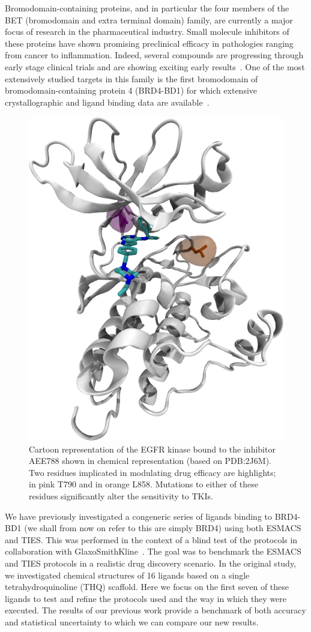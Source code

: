 \documentclass[conference]{IEEEtran}
\begin{document}
Bromodomain-containing proteins, and in particular the four members of the BET
(bromodomain and extra terminal domain) family, are currently a major focus of
research in the pharmaceutical industry. Small molecule inhibitors of these
proteins have shown promising preclinical efficacy in pathologies ranging from
cancer to inflammation. Indeed, several compounds are progressing through
early stage clinical trials and are showing exciting early
results~\cite{Theodoulou2016}. One of the most extensively studied targets in
this family is the first bromodomain of bromodomain-containing protein 4
(BRD4-BD1) for which extensive crystallographic and ligand binding data are
available~\cite{Bamborough2012}.

\begin{figure}
  \centering
  \includegraphics[width=0.60\columnwidth]{./egfr.png}
  \caption{Cartoon representation of the EGFR kinase bound to the inhibitor
  AEE788 shown in chemical representation (based on PDB:2J6M). Two residues
  implicated in modulating drug efficacy are highlights; in pink T790 and in
  orange L858. Mutations to either of these residues significantly alter the
  sensitivity to TKIs.}\label{fig:egfr}
\end{figure}


We have previously investigated a congeneric series of ligands binding to
BRD4-BD1 (we shall from now on refer to this are simply BRD4) using both
ESMACS and TIES. This was performed in the context of a blind test of the
protocols in collaboration with GlaxoSmithKline~\cite{Wan2017brd4}. The goal
was to benchmark the ESMACS and TIES protocols in a realistic drug discovery
scenario. In the original study, we investigated chemical structures of 16
ligands based on a single tetrahydroquinoline (THQ) scaffold. %
Here we focus on the first seven of these ligands to test
and refine the protocols used and the way in which they were executed. The
results of our previous work provide a benchmark of both accuracy and
statistical uncertainty to which we can compare our new results.
\end{document}
